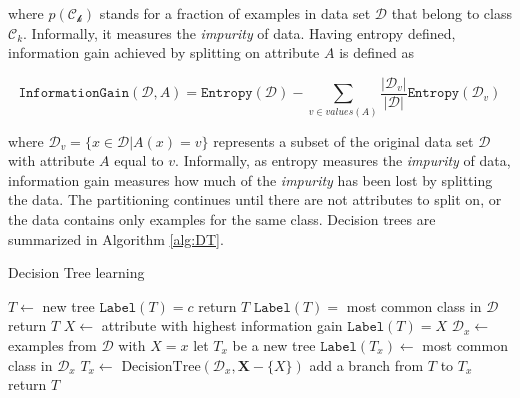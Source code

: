 where $p(\mathcal{C_k})$ stands for a fraction of examples in data set $\mathcal{D}$ that belong to class $\mathcal{C}_k$. Informally, it measures the \textit{impurity} of data. Having entropy defined, information gain achieved by splitting on attribute $A$ is defined as

\begin{equation}
	\mathtt{InformationGain}(\mathcal{D}, A) = \mathtt{Entropy}(\mathcal{D}) - \sum_{v \in values(A)} \frac{\vert \mathcal{D}_v \vert}{\vert \mathcal{D} \vert}\mathtt{Entropy}(\mathcal{D}_v)
\end{equation} 

where $\mathcal{D}_v = \{ x \in \mathcal{D} | A(x) = v \}$ represents a subset of the original data set $\mathcal{D}$ with attribute $A$ equal to $v$. Informally, as entropy measures the \textit{impurity} of data, information gain measures how much of the \textit{impurity} has been lost by splitting the data. The partitioning continues until there are not attributes to split on, or the data contains only examples for the same class. Decision trees are summarized in Algorithm \ref{alg:DT}.


\begin{algorithm}
	\caption{Decision Tree learning}
	\label{alg:DT}
	\begin{algorithmic}[1]
			\State $T \gets$ new tree
				\State $\mathtt{Label}(T) = c$
				\State return $T$
			\EndIf	
				\State $\mathtt{Label}(T) = $ most common class in $\mathcal{D}$
				\State return $T$
			\EndIf 
			\State $X \gets$ attribute with highest information gain
			\State $\mathtt{Label}(T) = X$
				\State $\mathcal{D}_x \gets $ examples from $\mathcal{D}$ with $X = x$
					\State let $T_x$ be a new tree
					\State $\mathtt{Label}(T_x) \gets $ most common class in $\mathcal{D}_x$
				\Else
					\State $T_x \gets \text{ DecisionTree}(\mathcal{D}_x, \mathbf{X} - \{ X \})$
				\EndIf
				\State add a branch from $T$ to $T_x$
			\EndFor
			\State return $T$
		\EndFunction 
	\end{algorithmic}
\end{algorithm}


